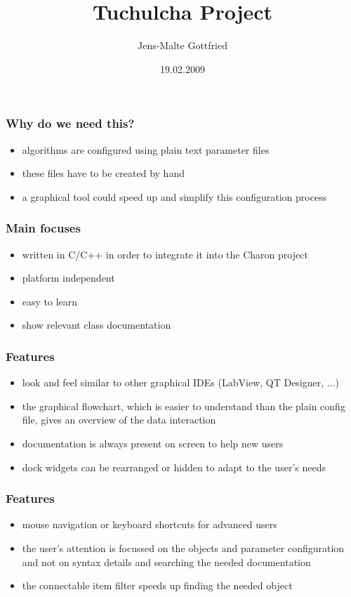 \documentclass[17pt,notes=hide,amsmath=namelimits,sumlimits,intlimits]{beamer}
\title[Tuchulcha]{Tuchulcha Project}
\author[J.M.Gottfried]{Jens-Malte Gottfried}
\date{19.02.2009}
\begin{document}
\begin{frame}
  \titlepage
\end{frame}

\begin{frame}
  \frametitle{Why do we need this?}
  \begin{itemize}
    \item algorithms are configured using plain text parameter files
    \item these files have to be created by hand
    \item a graphical tool could speed up and simplify
	  this configuration process
  \end{itemize}
\end{frame}

\begin{frame}
  \frametitle{Main focuses}
  \begin{itemize}
    \item written in C/C++ in order to integrate it
	  into the Charon project
    \item platform independent
    \item easy to learn
    \item show relevant class documentation
  \end{itemize}
\end{frame}

\begin{frame}
  \frametitle{Features}
  \begin{itemize}
    \item look and feel similar to other graphical IDEs
	  (LabView, QT Designer, ...)
    \item the graphical flowchart, which is easier to understand
	  than the plain config file, gives an overview of the data interaction
    \item documentation is always present on screen to help new users
    \item dock widgets can be rearranged or hidden to adapt to the user's needs
  \end{itemize}
\end{frame}

\begin{frame}
  \frametitle{Features}
  \begin{itemize}
    \item mouse navigation or keyboard shortcuts for advanced users
    \item the user's attention is focussed on the objects and parameter
	  configuration and not on syntax details and searching
	  the needed documentation
    \item the connectable item filter speeds up finding the needed object
  \end{itemize}
\end{frame}
\end{document}
